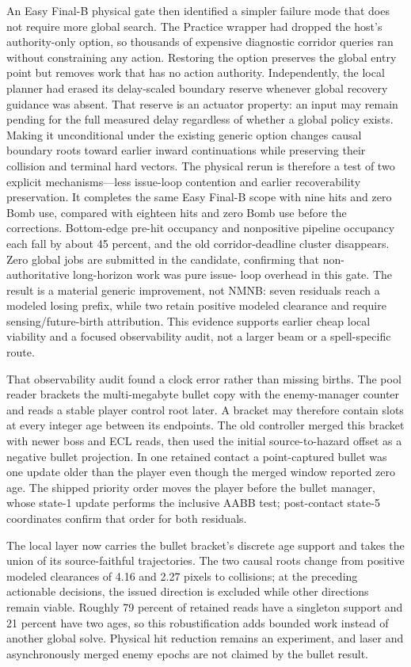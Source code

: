 \documentclass[10pt]{article}
\begin{document}
An Easy Final-B physical gate then identified a simpler failure mode that does
not require more global search.  The Practice wrapper had dropped the host's
authority-only option, so thousands of expensive diagnostic corridor queries
ran without constraining any action.  Restoring the option preserves the
global entry point but removes work that has no action authority.  Independently,
the local planner had erased its delay-scaled boundary reserve whenever global
recovery guidance was absent.  That reserve is an actuator property: an input
may remain pending for the full measured delay regardless of whether a global
policy exists.  Making it unconditional under the existing generic option
changes causal boundary roots toward earlier inward continuations while
preserving their collision and terminal hard vectors.  The physical rerun is
therefore a test of two explicit mechanisms---less issue-loop contention and
earlier recoverability preservation.  It completes the same Easy Final-B
scope with nine hits and zero Bomb use, compared with eighteen hits and zero
Bomb use before the corrections.  Bottom-edge pre-hit occupancy and
nonpositive pipeline occupancy each fall by about 45 percent, and the old
corridor-deadline cluster disappears.  Zero global jobs are submitted in the
candidate, confirming that non-authoritative long-horizon work was pure issue-
loop overhead in this gate.  The result is a material generic improvement, not
NMNB: seven residuals reach a modeled losing prefix, while two retain positive
modeled clearance and require sensing/future-birth attribution.  This evidence
supports earlier cheap local viability and a focused observability audit, not
a larger beam or a spell-specific route.

That observability audit found a clock error rather than missing births.  The
pool reader brackets the multi-megabyte bullet copy with the enemy-manager
counter and reads a stable player control root later.  A bracket may therefore
contain slots at every integer age between its endpoints.  The old controller
merged this bracket with newer boss and ECL reads, then used the initial
source-to-hazard offset as a negative bullet projection.  In one retained
contact a point-captured bullet was one update older than the player even
though the merged window reported zero age.  The shipped priority order moves
the player before the bullet manager, whose state-1 update performs the
inclusive AABB test; post-contact state-5 coordinates confirm that order for
both residuals.

The local layer now carries the bullet bracket's discrete age support and
takes the union of its source-faithful trajectories.  The two causal roots
change from positive modeled clearances of 4.16 and 2.27 pixels to collisions;
at the preceding actionable decisions, the issued direction is excluded while
other directions remain viable.  Roughly 79 percent of retained reads have a
singleton support and 21 percent have two ages, so this robustification adds
bounded work instead of another global solve.  Physical hit reduction remains
an experiment, and laser and asynchronously merged enemy epochs are not
claimed by the bullet result.
\end{document}
